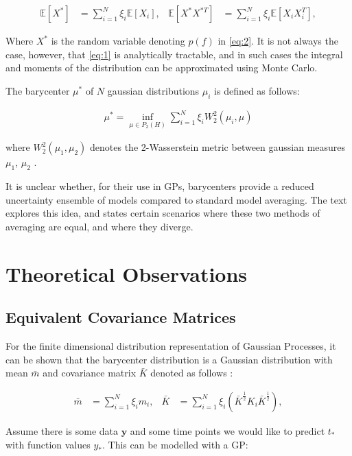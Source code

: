 \documentclass[12pt]{article}
\begin{document}
\begin{align*}
    \mathbb{E}[X^*] &= \sum_{i=1}^N \xi_i \mathbb{E}[X_i], &
    \mathbb{E}[X^*X^{*T}] &= \sum_{i=1}^N \xi_i \mathbb{E}[X_iX_i^T],
\end{align*}

Where $X^*$ is the random variable denoting $p(f)$ in \ref{eq:2}. It is not always
the case, however, that \ref{eq:1} is analytically tractable, and in such cases
the integral and moments of the distribution can be approximated using Monte Carlo.

The barycenter $\mu^*$ of $N$ gaussian distributions $\mu _i$ is defined as follows:

\begin{align*} \label{barycenter:1}
    \mu^* = \inf_{\mu \in P_2(H)} \sum_{i=1}^{N} \xi_i W_2^2(\mu_i, \mu)
\end{align*}

where $W_2^2(\mu_1, \mu_2)$ denotes the 2-Wasserstein metric between gaussian
measures $\mu_1$, $\mu_2$ \cite{NIPS2017_7149}.

It is unclear whether, for their use in GPs, barycenters provide a reduced uncertainty
ensemble of models compared to standard model averaging. The text explores this idea,
and states certain scenarios where these two methods of averaging are equal, and where
they diverge.

\section{Theoretical Observations}

\subsection{Equivalent Covariance Matrices}

For the finite dimensional distribution representation of Gaussian Processes, it
can be shown that the barycenter distribution is a Gaussian distribution with
mean $\bar{m}$ and covariance matrix $\bar{K}$ denoted as follows \cite{NIPS2017_7149}:

\begin{align*}
    \bar{m} &= \sum_{i=1}^{N} \xi_i m_i, &
    \bar{K} &= \sum_{i=1}^{N} \xi_i (\bar{K}^{\frac{1}{2}} K_i \bar{K}^{\frac{1}{2}}),
\end{align*}

Assume there is some data $\textbf{y}$ and some time points we would like to predict
$t_*$ with function values $y_*$. This can be modelled with a GP:
\end{document}
